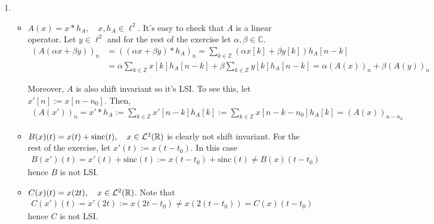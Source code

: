 \documentclass{article}
\begin{document}
    
    \begin{enumerate}[label=(\roman*)]
        \item
        \begin{itemize}
            \item $A(x)=x * h_A, \quad x, h_A\in \ell^2$. It's easy to check that $A$ is a linear operator. Let $y\in \ell^2$ and for the rest of the exercise let $\alpha, \beta \in \mathbb{C}$.
            \begin{align}
                (A(\alpha x + \beta y))_n&=((\alpha x + \beta y) * h_A)_n = \sum_{k\in \mathbb{Z}} (\alpha x[k] + \beta y[k]) h_A[n-k]\\
                &=\alpha \sum_{k\in \mathbb{Z}} x[k]h_A[n-k] + \beta \sum_{k\in \mathbb{Z}} y[k] h_A[n-k] = \alpha (A(x))_n + \beta (A(y))_n
            \end{align}
            
            Moreover, $A$ is also shift invariant so it's LSI. To see this, let $x'[n]:=x[n-n_0]$. Then,
            \begin{align}
                (A(x'))_n= x' * h_A := \sum_{k\in \mathbb{Z}} x'[n-k] h_A[k] := \sum_{k\in \mathbb{Z}} x[n-k-n_0] h_A[k] = (A(x))_{n-n_0}
            \end{align}
            \item $B(x)(t)=x(t)+\text{sinc}(t),\quad x\in \mathcal{L}^2(\mathbb{R})$ is clearly not shift invariant. For the rest of the exercise, let $x'(t):=x(t-t_0)$. In this case
            \begin{align}
                B(x')(t)=x'(t)+\text{sinc}(t):=x(t-t_0)+\text{sinc}(t)\neq B(x)(t-t_0)
            \end{align}
            hence $B$ is not LSI.
            
            \item $C(x)(t)=x(2t),\quad x \in \mathcal{L}^2(\mathbb{R})$. Note that
            \begin{align}
                C(x')(t) = x'(2t) := x(2t-t_0)\neq x(2(t-t_0)) = C(x)(t-t_0)
            \end{align}
            hence $C$ is not LSI.
            

\end{itemize}
\end{enumerate}
\end{document}
